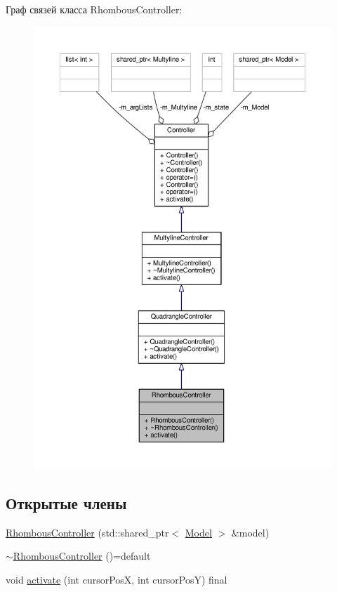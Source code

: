 Граф связей класса Rhombous\-Controller\-:
\nopagebreak
\begin{figure}[H]
\begin{center}
\leavevmode
\includegraphics[width=350pt]{class_rhombous_controller__coll__graph}
\end{center}
\end{figure}
\subsection*{Открытые члены}
\begin{DoxyCompactItemize}
\item 
\hyperlink{class_rhombous_controller_af001407b5bd87b3bdedd7814d61184c0}{Rhombous\-Controller} (std\-::shared\-\_\-ptr$<$ \hyperlink{class_model}{Model} $>$ \&model)
\item 
\hyperlink{class_rhombous_controller_aa39b60d4b91fa169c71ae71a66fcc615}{$\sim$\-Rhombous\-Controller} ()=default
\item 
void \hyperlink{class_rhombous_controller_a9e839123b8a65d202fb898b6233694b2}{activate} (int cursor\-Pos\-X, int cursor\-Pos\-Y) final
\end{DoxyCompactItemize}


